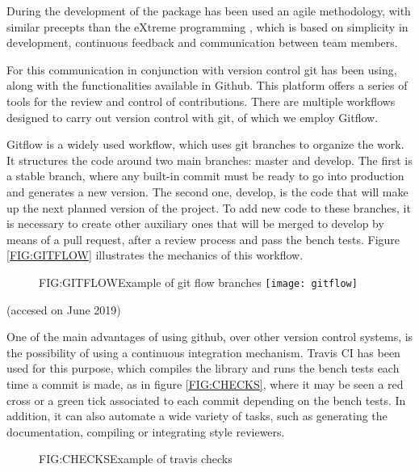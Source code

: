 During the development of the package has been used an agile methodology, with
similar precepts than the eXtreme programming \cite{eXtreme}, which is based on
simplicity in development, continuous feedback and communication between
team members.

For this communication in conjunction with version control git has been using,
along with the functionalities available in Github. This platform offers a
series of tools for the review and control of contributions. There are multiple
workflows designed to carry out version control with git, of which we employ
Gitflow.

Gitflow is a widely used workflow, which uses git branches to organize the work.
It structures the code around two main branches: master and develop. The first
is a stable branch, where any built-in commit must be ready to go into
production and generates a new version. The second one, develop, is the code
that will make up the next planned version of the project. To add new code to
these branches, it is necessary to create other auxiliary ones that will be
merged to develop by means of a pull request, after a review process and pass
the bench tests. Figure \ref{FIG:GITFLOW} illustrates the mechanics of this
workflow.


\begin{figure}[Example of git flow branches]{FIG:GITFLOW}{Example of git flow branches \footnotemark}
  \texttt{[image: gitflow]}
\end{figure}

 (accesed on June 2019)

One of the main advantages of using github, over other version control systems,
is the possibility of using a continuous integration mechanism. Travis CI has
been used for this purpose, which compiles the library and runs the bench tests
each time a commit is made, as in figure \ref{FIG:CHECKS}, where it may be seen a red cross
or a green tick associated to each commit depending on the bench tests. In
addition, it can also automate a wide variety of tasks, such as generating the
documentation, compiling or integrating style reviewers.

\begin{figure}[Example of travis checks]{FIG:CHECKS}{Example of travis checks}
\end{figure}
